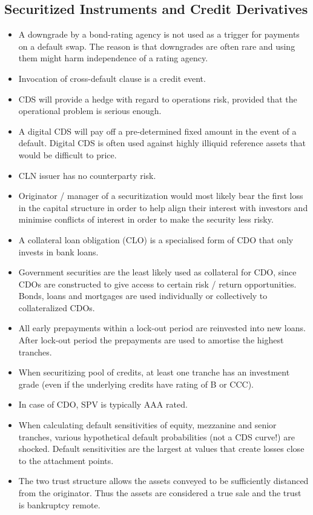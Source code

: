\subsection{Securitized Instruments and Credit Derivatives}
\begin{itemize}
	\item A downgrade by a bond-rating agency is not used  as a trigger for payments on a default swap. The reason is that downgrades are often rare and using them might harm independence of a rating agency.
	\item Invocation of cross-default clause is a credit event.
	\item CDS will provide a hedge with regard to operations risk, provided that the operational problem is serious enough.
	\item A digital CDS will pay off a pre-determined fixed amount in the event of a default. Digital CDS is often used against highly illiquid reference assets that would be difficult to price.
	\item CLN issuer has no counterparty risk.
	\item Originator / manager of a securitization would most likely bear the first loss in the capital structure in order to help align their interest with investors and minimise conflicts of interest in order to make the security less risky.
	\item A collateral loan obligation (CLO) is a specialised form of CDO that only invests in bank loans.
	\item Government securities are the least likely used as collateral for CDO, since CDOs are constructed to give access to certain risk / return opportunities. Bonds, loans and mortgages are used individually or collectively to collateralized CDOs.
	\item All early prepayments within a lock-out period are reinvested into new loans. After lock-out period the prepayments are used to amortise the highest tranches.
	\item When securitizing pool of credits, at least one tranche has an investment grade (even if the underlying credits have rating of B or CCC).
	\item In case of CDO, SPV is typically AAA rated.
	\item When calculating default sensitivities of equity, mezzanine and senior tranches, various hypothetical default probabilities (not a CDS curve!) are shocked. Default sensitivities are the largest at values that create losses close to the attachment points.
	\item The two trust structure allows the assets conveyed to be sufficiently distanced from the originator. Thus the assets are considered a true sale and the trust is bankruptcy remote.

\end{itemize}
